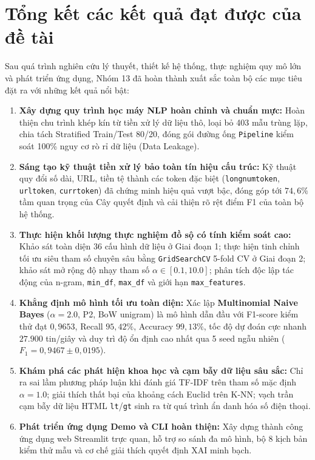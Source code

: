 \section{Tổng kết các kết quả đạt được của đề tài}
\label{sec:tong-ket-ket-qua}

Sau quá trình nghiên cứu lý thuyết, thiết kế hệ thống, thực nghiệm quy mô lớn và phát triển ứng dụng, Nhóm 13 đã hoàn thành xuất sắc toàn bộ các mục tiêu đặt ra với những kết quả nổi bật:
\begin{enumerate}
    \item \textbf{Xây dựng quy trình học máy NLP hoàn chỉnh và chuẩn mực:} Hoàn thiện chu trình khép kín từ tiền xử lý dữ liệu thô, loại bỏ 403 mẫu trùng lặp, chia tách Stratified Train/Test 80/20, đóng gói đường ống \texttt{Pipeline} kiểm soát 100\% nguy cơ rò rỉ dữ liệu (Data Leakage).
    \item \textbf{Sáng tạo kỹ thuật tiền xử lý bảo toàn tín hiệu cấu trúc:} Kỹ thuật quy đổi số dài, URL, tiền tệ thành các token đặc biệt (\texttt{longnumtoken}, \texttt{urltoken}, \texttt{currtoken}) đã chứng minh hiệu quả vượt bậc, đóng góp tới $74,6\%$ tầm quan trọng của Cây quyết định và cải thiện rõ rệt điểm F1 của toàn bộ hệ thống.
    \item \textbf{Thực hiện khối lượng thực nghiệm đồ sộ có tính kiểm soát cao:} Khảo sát toàn diện 36 cấu hình dữ liệu ở Giai đoạn 1; thực hiện tinh chỉnh tối ưu siêu tham số chuyên sâu bằng \texttt{GridSearchCV} 5-fold CV ở Giai đoạn 2; khảo sát mở rộng độ nhạy tham số $\alpha \in [0.1, 10.0]$; phân tích độc lập tác động của n-gram, \texttt{min\_df}, \texttt{max\_df} và giới hạn \texttt{max\_features}.
    \item \textbf{Khẳng định mô hình tối ưu toàn diện:} Xác lập \textbf{Multinomial Naive Bayes} ($\alpha=2.0$, P2, BoW unigram) là mô hình dẫn đầu với F1-score kiểm thử đạt \textbf{$0,9653$}, Recall \textbf{$95,42\%$}, Accuracy \textbf{$99,13\%$}, tốc độ dự đoán cực nhanh $27.900$ tin/giây và duy trì độ ổn định cao nhất qua 5 seed ngẫu nhiên ($F_1 = 0,9467 \pm 0,0195$).
    \item \textbf{Khám phá các phát hiện khoa học và cạm bẫy dữ liệu sâu sắc:} Chỉ ra sai lầm phương pháp luận khi đánh giá TF-IDF trên tham số mặc định $\alpha=1.0$; giải thích thất bại của khoảng cách Euclid trên K-NN; vạch trần cạm bẫy dữ liệu HTML \texttt{lt}/\texttt{gt} sinh ra từ quá trình ẩn danh hóa số điện thoại.
    \item \textbf{Phát triển ứng dụng Demo và CLI hoàn thiện:} Xây dựng thành công ứng dụng web Streamlit trực quan, hỗ trợ so sánh đa mô hình, bộ 8 kịch bản kiểm thử mẫu và cơ chế giải thích quyết định XAI minh bạch.
\end{enumerate}

